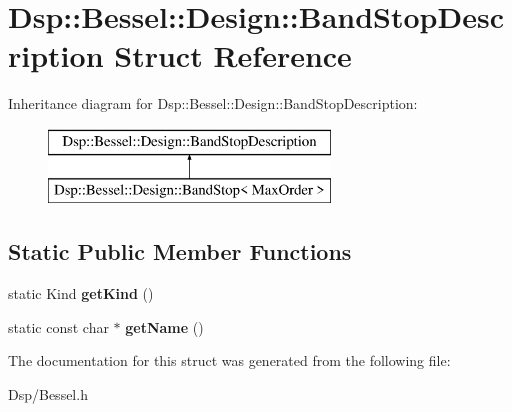 \hypertarget{structDsp_1_1Bessel_1_1Design_1_1BandStopDescription}{\section{Dsp\-:\-:Bessel\-:\-:Design\-:\-:Band\-Stop\-Description Struct Reference}
\label{structDsp_1_1Bessel_1_1Design_1_1BandStopDescription}
}
Inheritance diagram for Dsp\-:\-:Bessel\-:\-:Design\-:\-:Band\-Stop\-Description\-:\begin{figure}[H]
\begin{center}
\leavevmode
\includegraphics[height=2.000000cm]{structDsp_1_1Bessel_1_1Design_1_1BandStopDescription}
\end{center}
\end{figure}
\subsection*{Static Public Member Functions}
\begin{DoxyCompactItemize}
\item 
\hypertarget{structDsp_1_1Bessel_1_1Design_1_1BandStopDescription_a0e90bdc4af989e7eec7ae2f460200c12}{static Kind {\bfseries get\-Kind} ()}\label{structDsp_1_1Bessel_1_1Design_1_1BandStopDescription_a0e90bdc4af989e7eec7ae2f460200c12}

\item 
\hypertarget{structDsp_1_1Bessel_1_1Design_1_1BandStopDescription_a864a54017d7debf342ef4d398084058e}{static const char $\ast$ {\bfseries get\-Name} ()}\label{structDsp_1_1Bessel_1_1Design_1_1BandStopDescription_a864a54017d7debf342ef4d398084058e}

\end{DoxyCompactItemize}


The documentation for this struct was generated from the following file\-:\begin{DoxyCompactItemize}
\item 
Dsp/Bessel.\-h\end{DoxyCompactItemize}
